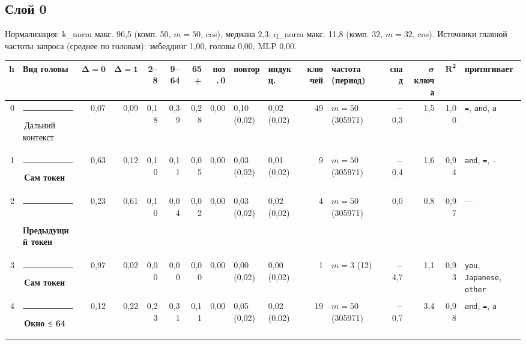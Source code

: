 \documentclass[10pt]{article}
\begin{document}
\noindent\begin{minipage}{\linewidth}
\subsection*{Слой 0}
{\small\color{ink2} Нормализация: k\_norm макс. 96,5 (комп. 50, $m{=}50$, cos), медиана 2,3; q\_norm макс. 11,8 (комп. 32, $m{=}32$, cos). Источники главной частоты запроса (среднее по головам): эмбеддинг 1,00, головы 0,00, MLP 0,00.}
\begin{center}{\footnotesize\begin{tabular}{|r|l|r|r|r|r|r|r|l|l|r|l|r|r|r|l|}
\hline
\rowcolor{head}\textbf{h} & \textbf{Вид головы} & $\boldsymbol{\Delta{=}0}$ & $\boldsymbol{\Delta{=}1}$ & \textbf{2–8} & \textbf{9–64} & \textbf{65+} & \textbf{поз.\,0} & \textbf{повтор} & \textbf{индукц.} & \textbf{ключей} & \textbf{частота (период)} & \textbf{спад} & $\boldsymbol{\sigma}$ \textbf{ключа} & $\boldsymbol{R^2}$ & \textbf{притягивает} \\ \hline
0 & \textcolor[HTML]{C3C2B7}{\rule{0.62em}{0.62em}}\,Дальний контекст & 0,07 & 0,09 & 0,18 & 0,39 & 0,28 & 0,00 & 0,10 (0,02) & 0,02 (0,02) & 49 & $m{=}50$ (305971) & $-$0,3 & 1,5 & 1,00 & \texttt{\textvisiblespace{}=}, \texttt{\textvisiblespace{}and}, \texttt{\textvisiblespace{}a} \\ \hline
1 & \textcolor[HTML]{2A78D6}{\rule{0.62em}{0.62em}}\,\textbf{Сам токен} & 0,63 & 0,12 & 0,10 & 0,11 & 0,05 & 0,00 & 0,03 (0,02) & 0,01 (0,02) & 9 & $m{=}50$ (305971) & $-$0,4 & 1,6 & 0,94 & \texttt{\textvisiblespace{}and}, \texttt{\textvisiblespace{}=}, \texttt{{-}} \\ \hline
2 & \textcolor[HTML]{2A78D6}{\rule{0.62em}{0.62em}}\,\textbf{Предыдущий токен} & 0,23 & 0,61 & 0,10 & 0,04 & 0,02 & 0,00 & 0,03 (0,02) & 0,02 (0,02) & 4 & $m{=}50$ (305971) & 0,0 & 0,8 & 0,97 & — \\ \hline
3 & \textcolor[HTML]{2A78D6}{\rule{0.62em}{0.62em}}\,\textbf{Сам токен} & 0,97 & 0,02 & 0,00 & 0,00 & 0,00 & 0,00 & 0,00 (0,02) & 0,00 (0,02) & 1 & $m{=}3$ (12) & $-$4,7 & 1,1 & 0,93 & \texttt{\textvisiblespace{}you}, \texttt{\textvisiblespace{}Japanese}, \texttt{\textvisiblespace{}other} \\ \hline
4 & \textcolor[HTML]{EDA100}{\rule{0.62em}{0.62em}}\,\textbf{Окно ≤ 64} & 0,12 & 0,22 & 0,23 & 0,31 & 0,11 & 0,00 & 0,05 (0,02) & 0,02 (0,02) & 19 & $m{=}50$ (305971) & $-$0,7 & 3,4 & 0,98 & \texttt{\textvisiblespace{}and}, \texttt{\textvisiblespace{}=}, \texttt{\textvisiblespace{}a} \\ \hline

\end{tabular}}
\end{center}
\end{minipage}
\end{document}
